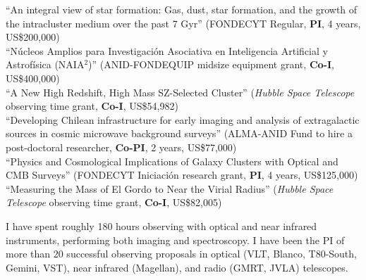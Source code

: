 \documentclass[11pt]{article}
\begin{document}
\hline



\noindent
{} ``An integral view of star formation: Gas, dust, star formation, and the growth of the intracluster medium over the past 7 Gyr'' (FONDECYT Regular, \textbf{PI}, 4 years, US\$200,000)\\
 ``Núcleos Amplios para Investigación Asociativa en Inteligencia Artificial y Astrofísica (NAIA$^2$)'' (ANID-FONDEQUIP midsize equipment grant, \textbf{Co-I}, US\$400,000)\\
 ``A New High Redshift, High Mass SZ-Selected Cluster'' (\textit{Hubble Space Telescope} observing time grant, \textbf{Co-I}, US\$54,982)\\
 ``Developing Chilean infrastructure for early imaging and analysis of
extragalactic sources in cosmic microwave background surveys'' (ALMA-ANID Fund to hire a post-doctoral researcher, \textbf{Co-PI}, 2 years, US\$77,000)\\
 ``Physics and Cosmological Implications of Galaxy Clusters with Optical and CMB Surveys'' (FONDECYT Iniciaci\'on research grant, \textbf{PI}, 4 years, US\$125,000)\\
 ``Measuring the Mass of El Gordo to Near the Virial Radius'' (\textit{Hubble Space Telescope} observing time grant, \textbf{Co-I}, US\$82,005)\\



\noindent
I have spent roughly 180 hours observing with optical and near infrared instruments, performing both imaging and spectroscopy.
I have been the PI of more than 20 successful observing proposals in optical (VLT, Blanco, T80-South, Gemini, VST), near infrared (Magellan), and radio (GMRT, JVLA) telescopes.
%
\end{document}

